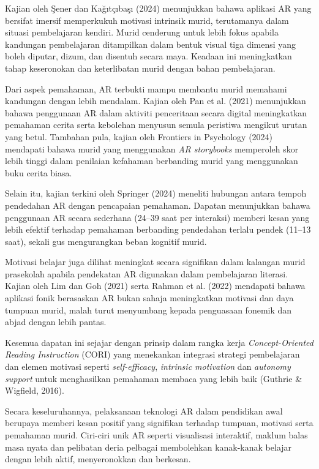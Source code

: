 \hspace{1cm}Kajian oleh Şener dan Kağıtçıbaşı (2024) menunjukkan bahawa aplikasi AR yang bersifat imersif memperkukuh motivasi intrinsik murid, terutamanya dalam situasi pembelajaran kendiri. Murid cenderung untuk lebih fokus apabila kandungan pembelajaran ditampilkan dalam bentuk visual tiga dimensi yang boleh diputar, dizum, dan disentuh secara maya. Keadaan ini meningkatkan tahap keseronokan dan keterlibatan murid dengan bahan pembelajaran.

\hspace{1cm}Dari aspek pemahaman, AR terbukti mampu membantu murid memahami kandungan dengan lebih mendalam. Kajian oleh Pan et al. (2021) menunjukkan bahawa penggunaan AR dalam aktiviti penceritaan secara digital meningkatkan pemahaman cerita serta kebolehan menyusun semula peristiwa mengikut urutan yang betul. Tambahan pula, kajian oleh Frontiers in Psychology (2024) mendapati bahawa murid yang menggunakan \textit{AR storybooks} memperoleh skor lebih tinggi dalam penilaian kefahaman berbanding murid yang menggunakan buku cerita biasa.

\hspace{1cm}Selain itu, kajian terkini oleh Springer (2024) meneliti hubungan antara tempoh pendedahan AR dengan pencapaian pemahaman. Dapatan menunjukkan bahawa penggunaan AR secara sederhana (24–39 saat per interaksi) memberi kesan yang lebih efektif terhadap pemahaman berbanding pendedahan terlalu pendek (11–13 saat), sekali gus mengurangkan beban kognitif murid.

\hspace{1cm}Motivasi belajar juga dilihat meningkat secara signifikan dalam kalangan murid prasekolah apabila pendekatan AR digunakan dalam pembelajaran literasi. Kajian oleh Lim dan Goh (2021) serta Rahman et al. (2022) mendapati bahawa aplikasi fonik berasaskan AR bukan sahaja meningkatkan motivasi dan daya tumpuan murid, malah turut menyumbang kepada penguasaan fonemik dan abjad dengan lebih pantas.

\hspace{1cm}Kesemua dapatan ini sejajar dengan prinsip dalam rangka kerja \textit{Concept-Oriented Reading Instruction} (CORI) yang menekankan integrasi strategi pembelajaran dan elemen motivasi seperti \textit{self-efficacy}, \textit{intrinsic motivation} dan \textit{autonomy support} untuk menghasilkan pemahaman membaca yang lebih baik (Guthrie \& Wigfield, 2016).

\hspace{1cm}Secara keseluruhannya, pelaksanaan teknologi AR dalam pendidikan awal berupaya memberi kesan positif yang signifikan terhadap tumpuan, motivasi serta pemahaman murid. Ciri-ciri unik AR seperti visualisasi interaktif, maklum balas masa nyata dan pelibatan deria pelbagai membolehkan kanak-kanak belajar dengan lebih aktif, menyeronokkan dan berkesan.


